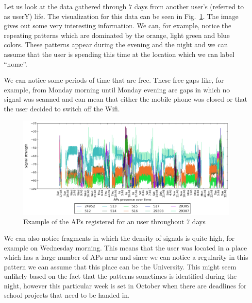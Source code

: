 Let us look at the data gathered through $7$ days from another user's (referred
to as userY) life. The visualization for this data can be seen in
Fig.~\ref{user_3_7d}. The image gives out some very interesting information. We
can, for example, notice the repeating patterns which are dominated by the
orange, light green and blue colors. These patterns appear during the evening
and the night and we can assume that the user is spending this time at the
location which we can label ``home''.

We can notice some periods of time that are free. These free gaps like, for
example, from Monday morning until Monday evening are gaps in which no signal
was scanned and can mean that either the mobile phone was closed or that the
user decided to switch off the Wifi.

\begin{figure}[ht]
\centering
\includegraphics[height =
0.45\textwidth]{figures/user_3_sorted_7days_plot.png}
\caption{Example of the APs registered for an user throughout 7 days}
\label{user_3_7d}
\end{figure}

We can also notice fragments in which the density of signals is quite high, for
example on Wednesday morning. This means that the user was located in a place
which has a large number of APs near and since we can notice a regularity in
this pattern we can assume that this place can be the University. This might
seem unlikely based on the fact that the patterns sometimes is identified during
the night, however this particular week is set in October when there are
deadlines for school projects that need to be handed in.

